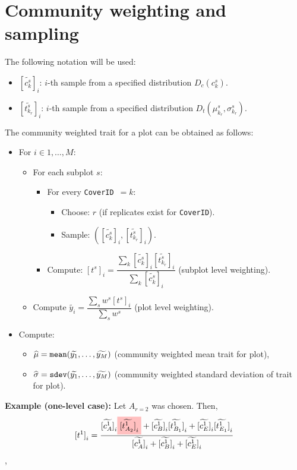 \documentclass[12pt]{article}
\let\frac\dfrac
\begin{document}
	\section*{Community weighting and sampling}
	The following notation will be used:
	\begin{itemize}
		\item 
		${[\widetilde{c_k^s}]}_i$: $i$-th sample from a specified distribution $D_c(c_k^s)$. 
		\item 
		${[\widetilde{t_{k_r}^s}]}_i$: $i$-th sample from a specified distribution $D_t(\mu_{k_r}^s, \sigma_{k_r}^s)$.
	\end{itemize} 
	The community weighted trait for a plot can be obtained as follows:
	\begin{itemize} 
		\item For $i \in {1, \ldots, M}$:
		\begin{itemize} 
			\item For each subplot $s$:
			\begin{itemize}
				\item For every \texttt{CoverID}~$=k$:
				\begin{itemize} 
					\item Choose: $r$ (if replicates exist for \texttt{CoverID}).
					\item Sample: $({[\widetilde{c_k^s}]}_i, {[\widetilde{t_{k_r}^s}]}_i)$.
				\end{itemize}
				\item Compute: ${[t^s]}_i = \frac{\sum_k{{[\widetilde{c_k^s}]}_i} {[\widetilde{t_{k_r}^s}]}_i}{\sum_k{{[\widetilde{c_k^s}]}_i}}$ (subplot level weighting). 
			\end{itemize} 
		\item Compute $\widetilde{y_i} = \frac{\sum_s{w^s}{{[t^s]}_i}}{\sum_s{w^s}}$ (plot level weighting).
		\end{itemize}
		\item Compute:
		\begin{itemize} 
			\item $\widehat{\mu} = \mbox{\texttt{mean}}(\widetilde{y_1}, \ldots, \widetilde{y_M})$ (community weighted mean trait for plot), 
			\item $\widehat{\sigma} = \mbox{\texttt{sdev}}(\widetilde{y_1}, \ldots, \widetilde{y_M})$ (community weighted standard deviation of trait for plot).
		\end{itemize}
	\end{itemize}
	
	\textbf{Example (one-level case):} Let $A_{r=2}$ was chosen. Then,
	\begin{equation*}
		{[t^{1}]}_i = 
		\frac{ {[\widetilde{c_A^{1}}]}_i \colorbox{pink}{$ \textstyle {[\widetilde{t_{A_2}^{1}}]}_i  $} + 
			   {[\widetilde{c_B^{1}}]}_i {[\widetilde{t_{B_1}^{1}}]}_i + 
			   {[\widetilde{c_E^{1}}]}_i {[\widetilde{t_{E_1}^{1}}]}_i}
			 { {[\widetilde{c_A^{1}}]}_i + {[\widetilde{c_B^{1}}]}_i + {[\widetilde{c_E^{1}}]}_i}
	\end{equation*},
		
\end{document}

